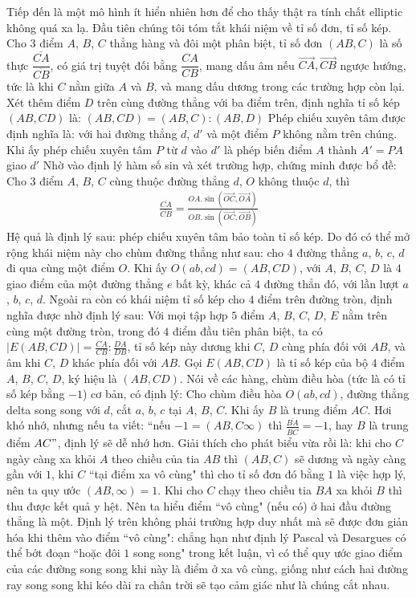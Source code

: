 \begin{multicols}{2}
	\vskip 0.1cm
	Tiếp đến là một mô hình ít hiển nhiên hơn để cho thấy thật ra tính chất elliptic không quá xa lạ. Đầu tiên chúng tôi tóm tắt khái niệm về tỉ số đơn, tỉ số kép. 
	\vskip 0.1cm
	Cho $3$ điểm $A$, $B$, $C$ thẳng hàng và đôi một phân biệt, tỉ số đơn $(AB, C)$ là số thực $ \dfrac{\overline{CA}}{\overline{CB}}$, có giá trị tuyệt đối bằng $\dfrac{CA}{CB}$, mang dấu âm nếu $ \vec{CA}, \vec{CB}$ ngược hướng, tức là khi $C$ nằm giữa $A$ và $B$, và mang dấu dương trong các trường hợp còn lại. 
	\vskip 0.1cm
	Xét thêm điểm $D$ trên cùng đường thẳng với ba điểm trên, định nghĩa tỉ số kép $(AB, CD)$ là:
	$(AB, CD) = (AB, C) : (AB, D)$
	Phép chiếu xuyên tâm được định nghĩa là: với hai đường thẳng $d$, $d'$ và một điểm $P$ không nằm trên chúng. Khi ấy phép chiếu xuyên tâm $P$ từ $d$ vào $d'$ là phép biến điểm $A$ thành $A' = PA$ giao $d'$
	\vskip 0.1cm
	Nhờ vào định lý hàm số sin và xét trường hợp, chứng minh được bổ đề: Cho $3$ điểm $A$, $B$, $C$ cùng thuộc đường thẳng $d$, $O$ không thuộc $d$, thì
	\begin{align*}
		\frac{ \overline{CA}}{\overline{CB}} = \frac{ OA. \sin( \vec{OC} , \vec{OA} )}{OB. \sin( \vec{OC}, \vec{OB})}
	\end{align*}
	Hệ quả là định lý sau: phép chiếu xuyên tâm bảo toàn tỉ số kép. Do đó có thể mở rộng khái niệm này cho chùm đường thẳng như sau: cho $4$ đường thẳng $a$, $b$, $c$, $d$ đi qua cùng một điểm $O$. Khi ấy $O(ab,cd) = (AB, CD)$, với $A$, $B$, $C$, $D$ là $4$ giao điểm của một đường thẳng $e$ bất kỳ, khác cả $4$ đường thẳn đó, với lần lượt $a$, $b$, $c$, $d$.   
	\vskip 0.1cm
	Ngoài ra còn có khái niệm tỉ số kép cho $4$ điểm trên đường tròn, định nghĩa được nhờ định lý sau:
	\vskip 0.1cm
	Với mọi tập hợp $5$ điểm $A$, $B$, $C$, $D$, $E$ nằm trên cùng một đường tròn, trong đó $4$ điểm đầu tiên phân biệt, ta có $|E(AB, CD)| = \frac{CA}{CB}: \frac{DA}{DB}$, tỉ số kép này dương khi $C$, $D$ cùng phía đối với $AB$, và âm khi $C$, $D$ khác phía đối với $AB$. Gọi $E(AB, CD)$ là tỉ số kép của bộ $4$ điểm $A$, $B$, $C$, $D$, ký hiệu là $(AB, CD)$.
	\vskip 0.1cm
	Nói về các hàng, chùm điều hòa (tức là có tỉ số kép bằng $-1$) cơ bản, có định lý:
	\vskip 0.1cm
	Cho chùm điều hòa $O(ab, cd)$, đường thẳng delta song song với $d$, cắt $a$, $b$, $c$ tại $A$, $B$, $C$. Khi ấy $B$ là trung điểm $AC$. 
	\vskip 0.1cm
	Hơi khó nhớ, nhưng nếu ta viết: ``nếu $-1 = (AB, C \infty )$ thì $\frac{ \overline{BA}}{ \overline{BC}} = -1$, hay $B$ là trung điểm $AC"$, định lý sẽ dễ nhớ hơn.
	Giải thích cho phát biểu vừa rồi là: khi cho $C$ ngày càng xa khỏi $A$ theo chiều của tia $AB$ thì $(AB, C)$ sẽ dương và ngày càng gần với $1$, khi $C$ ``tại điểm xa vô cùng" thì cho tỉ số đơn đó bằng $1$ là việc hợp lý, nên ta quy ước $(AB, \infty) = 1$. Khi cho $C$ chạy theo chiều tia $BA$ xa khỏi $B$ thì thu được kết quả y hệt. Nên ta hiểu điểm ``vô cùng" (nếu có) ở hai đầu đường thẳng là một. Định lý trên không phải trường hợp duy nhất mà sẽ được đơn giản hóa khi thêm vào điểm ``vô cùng": chẳng hạn như định lý Pascal và Desargues có thể bớt đoạn ``hoặc đôi $1$ song song" trong kết luận, vì có thể quy ước giao điểm của các đường song song khi này là điểm ở xa vô cùng, giống như cách hai đường ray song song khi kéo dài ra chân trời sẽ tạo cảm giác như là chúng cắt nhau.

\end{multicols}
